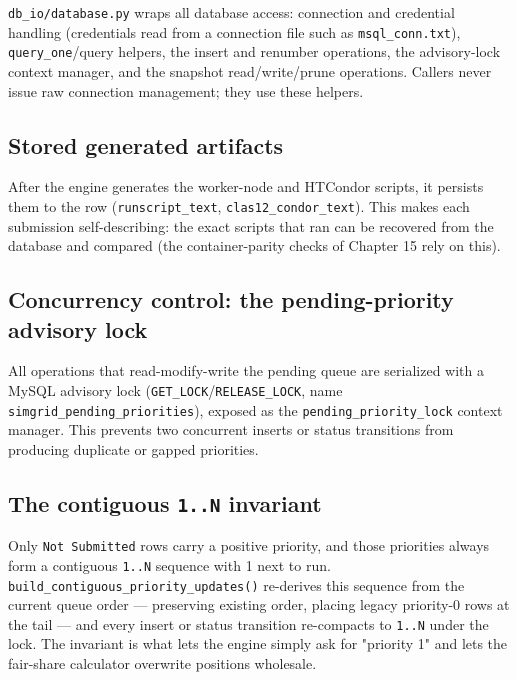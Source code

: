 \texttt{db\_\allowbreak{}io/\allowbreak{}database.\allowbreak{}py} wraps all database access: connection and
credential handling (credentials read from a connection file such as
\texttt{msql\_\allowbreak{}conn.\allowbreak{}txt}), \texttt{query\_\allowbreak{}one}/query helpers, the insert
and renumber operations, the advisory-lock context manager, and the snapshot read/write/prune operations.
Callers never issue raw connection management; they use these helpers.

\subsection{Stored generated artifacts}

After the engine generates the worker-node and HTCondor scripts, it persists them to the row
(\texttt{runscript\_\allowbreak{}text}, \texttt{clas12\_\allowbreak{}condor\_\allowbreak{}text}). This makes
each submission self-describing: the exact scripts that ran can be recovered from the database and compared
(the container-parity checks of Chapter 15 rely on this).

\subsection{Concurrency control: the pending-priority advisory lock}

All operations that read-modify-write the pending queue are serialized with a MySQL advisory lock
(\texttt{GET\_\allowbreak{}LOCK}/\texttt{RELEASE\_\allowbreak{}LOCK}, name
\texttt{simgrid\_\allowbreak{}pending\_\allowbreak{}priorities}), exposed as the
\texttt{pending\_\allowbreak{}priority\_\allowbreak{}lock} context manager. This prevents two concurrent
inserts or status transitions from producing duplicate or gapped priorities.

\subsection{The contiguous \texttt{1.\allowbreak{}.\allowbreak{}N} invariant}

Only \texttt{Not Submitted} rows carry a positive priority, and those priorities always form a contiguous
\texttt{1.\allowbreak{}.\allowbreak{}N} sequence with 1 next to run.
\texttt{build\_\allowbreak{}contiguous\_\allowbreak{}priority\_\allowbreak{}updates()} re-derives this sequence
from the current queue order --- preserving existing order, placing legacy priority-0 rows at the tail --- and
every insert or status transition re-compacts to \texttt{1.\allowbreak{}.\allowbreak{}N} under the lock. The
invariant is what lets the engine simply ask for "priority 1" and lets the fair-share calculator overwrite
positions wholesale.
